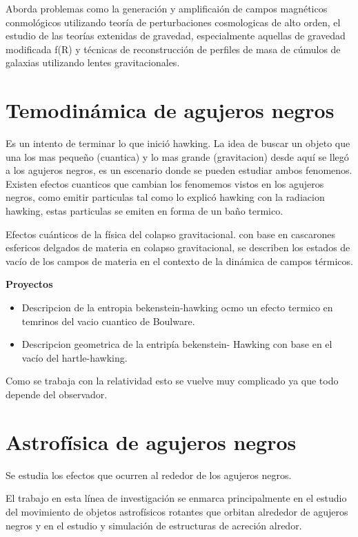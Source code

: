 \documentclass{article}
\begin{document}
Aborda problemas como la generación y amplificaión de campos magnéticos conmológicos utilizando teoría de perturbaciones cosmologicas de alto orden, el estudio de las teorías extenidas de gravedad, especialmente aquellas de gravedad modificada f(R) y técnicas de reconstrucción de perfiles de masa de cúmulos de galaxias utilizando lentes gravitacionales.

\section{Temodinámica de agujeros negros }
Es un intento de terminar lo que inició hawking. La idea de buscar un objeto que una los mas pequeño (cuantica) y lo mas grande (gravitacion) desde aquí se llegó a los agujeros negros, es un escenario donde se pueden estudiar ambos fenomenos. Existen efectos cuanticos que cambian los fenomemos vistos en los agujeros negros, como emitir particulas tal como lo explicó hawking con la radiacion hawking, estas particulas se emiten en forma de un baño termico. 

Efectos cuánticos de la física del colapso gravitacional. con base en cascarones esfericos delgados de materia en colapso gravitacional, se describen los estados de vacío de los campos de materia en el contexto de la dinámica de campos térmicos. 

\hfill

\textbf{Proyectos }
\begin{itemize}
  \item Descripcion de la entropia bekenstein-hawking ocmo un efecto termico en temrinos del vacio cuantico de Boulware. 
  \item Descripcion geometrica de la entripía bekenstein- Hawking con base en el vacío del hartle-hawking. 
\end{itemize}

Como se trabaja con la relatividad esto se vuelve muy complicado ya que todo depende del observador. 

\section{Astrofísica de agujeros negros }

Se estudia los efectos que ocurren al rededor de los agujeros negros. 
\hfill

El trabajo en esta línea de investigación se enmarca principalmente en el estudio del movimiento de objetos astrofísicos rotantes que orbitan alrededor de agujeros negros y en el estudio y simulación de estructuras de acreción alredor. 
\end{document}
